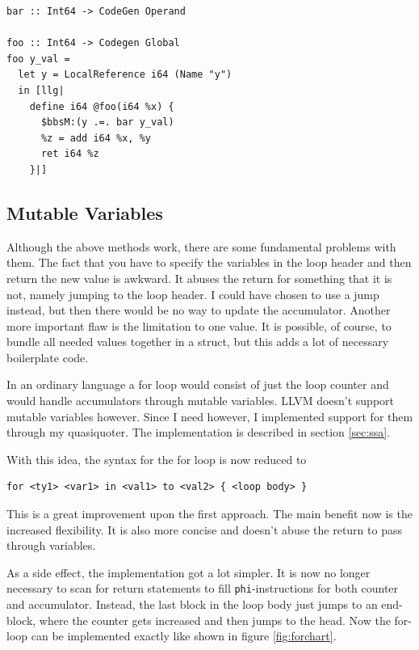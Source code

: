 \documentclass[a4paper,bibliography=totocnumbered,parskip,headsepline]{scrbook}
\begin{document}
\begin{lstlisting}
bar :: Int64 -> CodeGen Operand

foo :: Int64 -> Codegen Global
foo y_val =
  let y = LocalReference i64 (Name "y")
  in [llg|
    define i64 @foo(i64 %x) {
      $bbsM:(y .=. bar y_val)
      %z = add i64 %x, %y
      ret i64 %z
    }|]
\end{lstlisting}


\subsection{Mutable Variables}
Although the above methods work, there are some fundamental problems with them.
The fact that you have to specify the variables in the loop header and then return the new value is awkward.
It abuses the return for something that it is not, namely jumping to the loop header.
I could have chosen to use a jump instead, but then there would be no way to update the accumulator.
Another more important flaw is the limitation to one value.
It is possible, of course, to bundle all needed values together in a struct, but this adds a lot of necessary boilerplate code.

In an ordinary language a for loop would consist of just the loop counter and would handle accumulators through mutable variables.
LLVM doesn't support mutable variables however.
Since I need however, I implemented support for them through my quasiquoter.
The implementation is described in section \ref{sec:ssa}.

With this idea, the syntax for the for loop is now reduced to
\begin{lstlisting}[numbers=none]
for <ty1> <var1> in <val1> to <val2> { <loop body> }
\end{lstlisting}
This is a great improvement upon the first approach.
The main benefit now is the increased flexibility.
It is also more concise and doesn't abuse the return to pass through variables.

As a side effect, the implementation got a lot simpler.
It is now no longer necessary to scan for return statements to fill \lstinline!phi!-instructions for both counter and accumulator.
Instead, the last block in the loop body just jumps to an end-block, where the counter gets increased and then jumps to the head.
Now the for-loop can be implemented exactly like shown in figure \ref{fig:forchart}.
\end{document}
